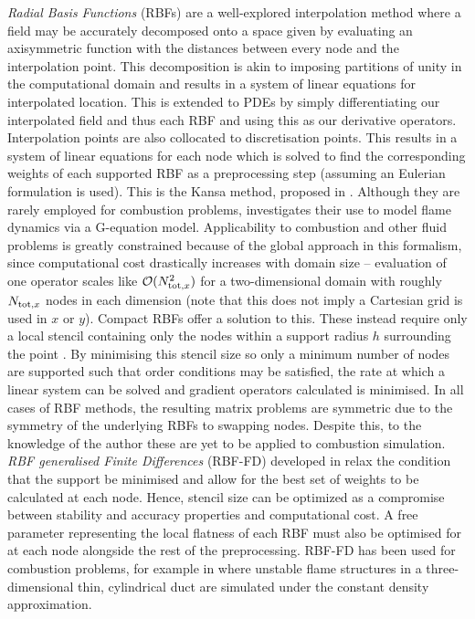 \emph{Radial Basis Functions} (RBFs) are a well-explored interpolation method where a field may be accurately decomposed onto a space given by evaluating an axisymmetric function with the distances between every node and the interpolation point. This decomposition is akin to imposing partitions of unity in the computational domain and results in a system of linear equations for interpolated location. This is extended to PDEs by simply differentiating our interpolated field and thus each RBF and using this as our derivative operators. Interpolation points are also collocated to discretisation points. This results in a system of linear equations for each node which is solved to find the corresponding weights of each supported RBF as a preprocessing step (assuming an Eulerian formulation is used). This is the Kansa method, proposed in \cite{kansa1990MultiquadricsScatteredData, kansa1990MultiquadricsScatteredDataa}. Although they are rarely employed for combustion problems, \cite{kansa2009NumericalSimulationTwodimensional} investigates their use to model flame dynamics via a G-equation model. Applicability to combustion and other fluid problems is greatly constrained because of the global approach in this formalism, since computational cost drastically increases with domain size -- evaluation of one operator scales like $\cl{O}(N_{\rm{tot}, x}^2)$ for a two-dimensional domain with roughly $N_{\rm{tot}, x}$ nodes in each dimension (note that this does not imply a Cartesian grid is used in $x$ or $y$). Compact RBFs offer a solution to this. These instead require only a local stencil containing only the nodes within a support radius $h$ surrounding the point \cite{buhmann2003RadialBasisFunctions}. By minimising this stencil size so only a minimum number of nodes are supported such that order conditions may be satisfied, the rate at which a linear system can be solved and gradient operators calculated is minimised. In all cases of RBF methods, the resulting matrix problems are symmetric due to the symmetry of the underlying RBFs to swapping nodes. Despite this, to the knowledge of the author these are yet to be applied to combustion simulation. \emph{RBF generalised Finite Differences} (RBF-FD) developed in \cite{shu2003LocalRadialBasis, cecil2004NumericalMethodsHigh, wright2003RadialBasisFunction} relax the condition that the support be minimised and allow for the best set of weights to be calculated at each node. Hence, stencil size can be optimized as a compromise between stability and accuracy properties and computational cost. A free parameter representing the local flatness of each RBF must also be optimised for at each node alongside the rest of the preprocessing. RBF-FD has been used for combustion problems, for example in \cite{bayona2013PropagationPremixedLaminar} where unstable flame structures in a three-dimensional thin, cylindrical duct are simulated under the constant density approximation.

